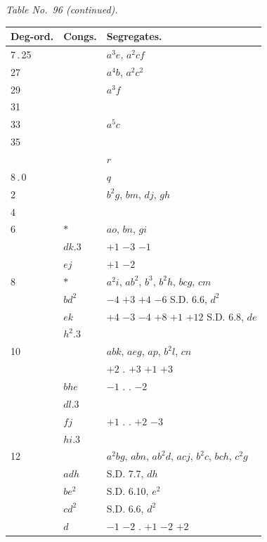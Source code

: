 \documentclass[11pt]{article}
\begin{document}

\begin{center}
\textit{Table No.\ 96 (continued).}
\end{center}

\begin{center}
\begin{tabular}{lll}
Deg-ord. & Congs. & Segregates. \\
\hline
7\,.\,25 & & $a^{3}e$, $a^{2}cf$ \\
27 & & $a^{4}b$, $a^{2}c^{2}$ \\
29 & & $a^{3}f$ \\
31 & & \\
33 & & $a^{5}c$ \\
35 & & \\
& & $r$ \\
\hline
8\,.\,0 & & $q$ \\
2 & & $b^{2}g$, $bm$, $dj$, $gh$ \\
4 & & \\
6 & $*$ & $ao$, $bn$, $gi$ \\
& $dk.3$ & $+1$ $-3$ $-1$ \\
& $ej$ & $+1$ $-2$ \\
8 & $*$ & $a^{2}i$, $ab^{2}$, $b^{3}$, $b^{2}h$, $bcg$, $cm$ \\
& $bd^{2}$ & $-4$ $+3$ $+4$ $-6$ \quad\quad S.D. 6.6, $d^{2}$ \\
& $ek$ & $+4$ $-3$ $-4$ $+8$ $+1$ $+12$ \quad S.D. 6.8, $de$ \\
& $h^{2}.3$ & \\
10 & & $abk$, $aeg$, $ap$, $b^{2}l$, $cn$ \\
& & $+2$ \quad . \quad $+3$ $+1$ $+3$ \\
& $bhe$ & \quad $-1$ \quad . \quad . \quad $-2$ \\
& $dl.3$ & \\
& $fj$ & $+1$ \quad . \quad . \quad $+2$ $-3$ \\
& $hi.3$ & \\
12 & & $a^{2}bg$, $abn$, $ab^{2}d$, $acj$, $b^{2}c$, $bch$, $c^{2}g$ \\
& $adh$ & \quad\quad\quad\quad\quad\quad S.D. 7.7, $dh$ \\
& $be^{2}$ & \quad\quad\quad\quad\quad\quad S.D. 6.10, $e^{2}$ \\
& $cd^{2}$ & \quad\quad\quad\quad\quad\quad S.D. 6.6, $d^{2}$ \\
& $d$ & $-1$ $-2$ \quad . \quad $+1$ $-2$ $+2$ \\

\end{tabular}
\end{center}
\end{document}
